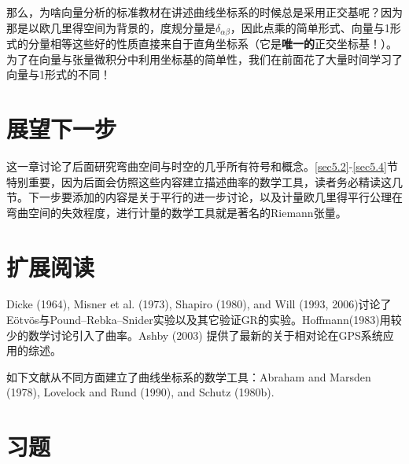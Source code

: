 那么，为啥向量分析的标准教材在讲述曲线坐标系的时候总是采用正交基呢？因为那是以欧几里得空间为背景的，度规分量是$\delta_{\alpha \beta}$，因此点乘的简单形式、向量与1形式的分量相等这些好的性质直接来自于直角坐标系（它是\textbf{唯一的}正交坐标基！）。为了在向量与张量微积分中利用坐标基的简单性，我们在前面花了大量时间学习了向量与1形式的不同！

\section{展望下一步}
\label{sec5.6}
这一章讨论了后面研究弯曲空间与时空的几乎所有符号和概念。\ref{sec5.2}-\ref{sec5.4}节特别重要，因为后面会仿照这些内容建立描述曲率的数学工具，读者务必精读这几节。下一步要添加的内容是关于平行的进一步讨论，以及计量欧几里得平行公理在弯曲空间的失效程度，进行计量的数学工具就是著名的Riemann张量。

\section{扩展阅读}
\label{sec5.7}
Dicke (1964), Misner et al. (1973), Shapiro (1980),
and Will (1993, 2006)讨论了Eötvös与Pound–Rebka–Snider实验以及其它验证GR的实验。Hoffmann(1983)用较少的数学讨论引入了曲率。Ashby (2003) 提供了最新的关于相对论在GPS系统应用的综述。

如下文献从不同方面建立了曲线坐标系的数学工具：Abraham and Marsden (1978), Lovelock and Rund (1990), and Schutz (1980b).

\section{习题}
\label{sec5.8}
